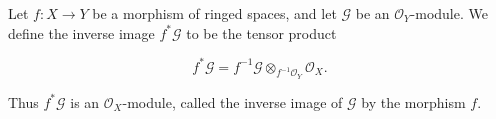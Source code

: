 Let $f: X \to Y$ be a morphism of ringed spaces, and let $\mathcal{G}$ be an $\mathcal{O}_Y$-module. We define the inverse image $f^*\mathcal{G}$ to be the tensor product

$$f^*\mathcal{G} = f^{-1}\mathcal{G} \otimes_{f^{-1}\mathcal{O}_Y} \mathcal{O}_X.$$

Thus $f^*\mathcal{G}$ is an $\mathcal{O}_X$-module, called the inverse image of $\mathcal{G}$ by the morphism $f$.
